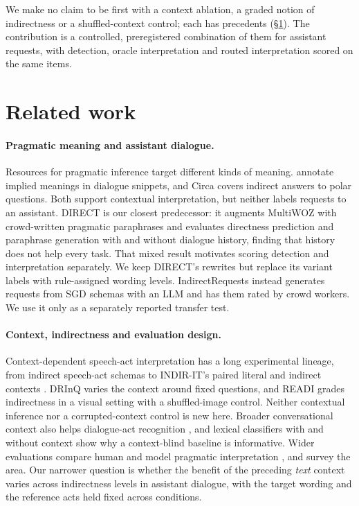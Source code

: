 \documentclass{article}
\begin{document}
We make no claim to be first with a context ablation, a graded notion of indirectness or a
shuffled-context control; each has precedents (\S\ref{sec:related}). The contribution is a
controlled, preregistered combination of them for assistant requests, with detection, oracle
interpretation and routed interpretation scored on the same items.

\section{Related work}
\label{sec:related}

\paragraph{Pragmatic meaning and assistant dialogue.}
Resources for pragmatic inference target different kinds of meaning. \citet{george2020implicatures}
annotate implied meanings in dialogue snippets, and Circa \citep{louis2020circa} covers indirect
answers to polar questions. Both support contextual interpretation, but neither labels requests
to an assistant. DIRECT \citep{takayama2021direct} is our closest predecessor: it augments
MultiWOZ with crowd-written pragmatic paraphrases and evaluates directness prediction and
paraphrase generation with and without dialogue history, finding that history does not help every
task. That mixed result motivates scoring detection and interpretation separately. We keep DIRECT's
rewrites but replace its variant labels with rule-assigned wording levels. IndirectRequests
\citep{mannekote2025indirect} instead generates requests from SGD schemas with an LLM and has them
rated by crowd workers. We use it only as a separately reported transfer test.

\paragraph{Context, indirectness and evaluation design.}
Context-dependent speech-act interpretation has a long experimental lineage, from indirect
speech-act schemas \citep{roque2020isa} to INDIR-IT's paired literal and indirect contexts
\citep{orsini2025indirit}. DRInQ \citep{arai2026drinq} varies the context around fixed questions,
and READI \citep{kim2026readi} grades indirectness in a visual setting with a shuffled-image
control. Neither contextual inference nor a corrupted-context control is new here. Broader
conversational context also helps dialogue-act recognition \citep{zelasko2021dialogacts}, and
lexical classifiers with and without context \citep{li2022implicatures} show why a context-blind
baseline is informative. Wider evaluations compare human and model pragmatic interpretation
\citep{hu2023pragmatics}, and \citet{ma2025survey} survey the area. Our narrower question is
whether the benefit of the preceding \emph{text} context varies across indirectness levels in
assistant dialogue, with the target wording and the reference acts held fixed across conditions.
\end{document}
